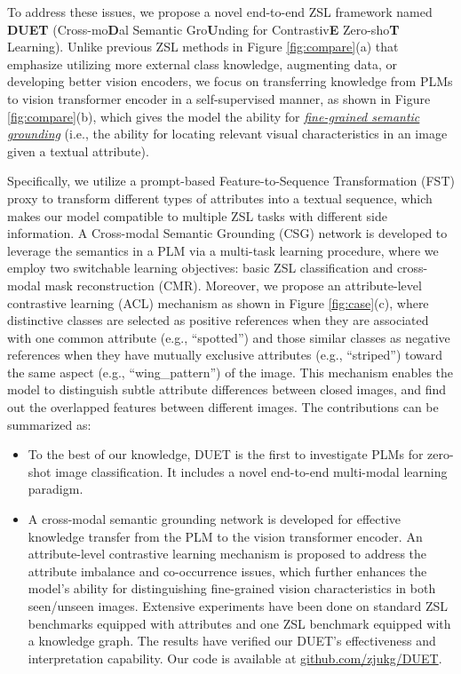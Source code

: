 \documentclass[letterpaper]{article} \usepackage{aaai23}  \usepackage{times}  \usepackage{helvet}  \usepackage{courier}  \usepackage[hyphens]{url}  \usepackage{graphicx} \urlstyle{rm} \def\UrlFont{\rm}  \usepackage{natbib}  \usepackage{caption} \frenchspacing  \setlength{\pdfpagewidth}{8.5in}  \setlength{\pdfpageheight}{11in}  \usepackage{algorithm}
\newcommand{\wen}[1]{{\color{black}#1}}
\newcommand{\fy}[1]{{\color{black}#1}}
\begin{document}
To address these issues, we propose a novel end-to-end ZSL framework {named} \textbf{DUET} 
(Cross-mo\textbf{D}al Semantic Gro\textbf{U}nding for Contrastiv\textbf{E} Zero-sho\textbf{T} Learning).
\fy{Unlike previous} ZSL methods in Figure \ref{fig:compare}(a) that 
{emphasize utilizing more} external class knowledge, {augmenting data}, or developing better vision encoders, 
\wen{we focus}
on transferring knowledge from PLMs to vision transformer encoder in a self-supervised manner, as shown in Figure \ref{fig:compare}(b), which gives \fy{the} model the ability for \ul{\emph{fine-grained semantic  grounding}} (i.e., the ability for locating relevant visual characteristics in an image given a textual attribute).

Specifically, 
we utilize a prompt-based Feature-to-Sequence Transformation (FST) proxy to 
{transform different types of attributes into a textual sequence,} 
which makes our model compatible to multiple {ZSL tasks with different side information.}
A Cross-modal Semantic Grounding (CSG) network is developed to leverage the semantics in a PLM  via a multi-task learning procedure, where we employ two switchable learning objective{s}: basic ZSL classification 
and cross-modal mask reconstruction (CMR).
Moreover, 
we propose \fy{an} attribute-level contrastive learning (ACL) \fy{mechanism} as shown in Figure \ref{fig:case}(c), where distinctive classes are selected as positive references when they are associated with one common attribute (e.g., “spotted”) and those similar classes as negative references when they have mutually exclusive attributes (e.g., “striped”) toward the same aspect (e.g., “wing\_pattern”) of the image.
This mechanism {enables} the model to distinguish \fy{subtle} attribute differences between closed images, and {find out the overlapped features}
between different \fy{images}.
The contributions can be summarized as:
 \begin{itemize}[leftmargin=*]
 \item To the best of our knowledge, DUET is the first to {investigate 
PLMs for zero-shot image classification. It includes a novel end-to-end multi-modal learning paradigm.}
 \item A cross-modal semantic grounding network is developed for {effective knowledge transfer from the PLM to the vision transformer encoder}.
An attribute-level contrastive learning mechanism is proposed to {address the attribute imbalance and co-occurrence issues, which further enhances \fy{the} model’s \fy{ability for distinguishing} fine-grained vision characteristics in both seen/unseen images}.
{Extensive experiments have been done on standard ZSL benchmarks equipped with attributes and one ZSL benchmark equipped with a knowledge graph. The results have verified our DUET's effectiveness and interpretation capability. }
Our code is available at \url{github.com/zjukg/DUET}.
\end{itemize}
\end{document}
